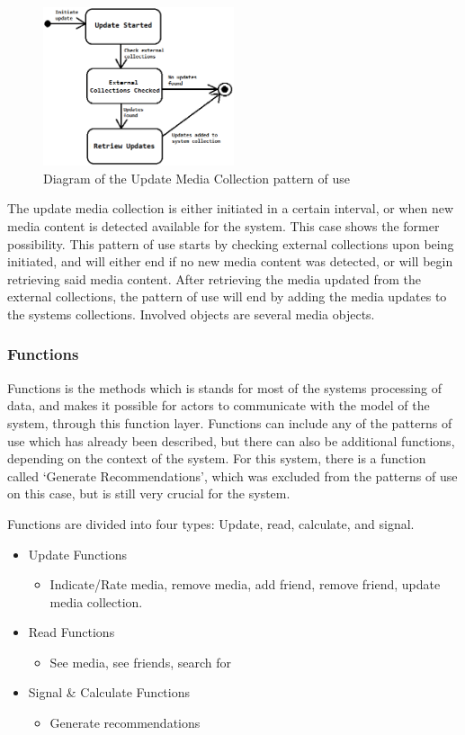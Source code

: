 \begin{figure}[htb]
\centering
\includegraphics[width=0.5\textwidth]{Images/UpdateCollection.png}
\caption{Diagram of the Update Media Collection pattern of use}
\label{UpdateCollection}
\end{figure}

The update media collection is either initiated in a certain interval, or when new media content is detected available for the system. This case shows the former possibility. This pattern of use starts by checking external collections upon being initiated, and will either end if no new media content was detected, or will begin retrieving said media content. After retrieving the media updated from the external collections, the pattern of use will end by adding the media updates to the systems collections. Involved objects are several media objects.

\subsubsection{Functions}

Functions is the methods which is stands for most of the systems processing of data, and makes it possible for actors to communicate with the model of the system, through this function layer. Functions can include any of the patterns of use which has already been described, but there can also be additional functions, depending on the context of the system. For this system, there is a function called ‘Generate Recommendations’, which was excluded from the patterns of use on this case, but is still very crucial for the system. 

Functions are divided into four types: Update, read, calculate, and signal.
\begin{itemize}
	\item Update Functions
	\begin{itemize}
		\item Indicate/Rate media, remove media, add friend, remove friend, update media collection.
	\end{itemize}
	\item Read Functions
	\begin{itemize}
		\item See media, see friends, search for
	\end{itemize}
	\item Signal \& Calculate Functions
	\begin{itemize}
		\item Generate recommendations
	\end{itemize}
\end{itemize}

